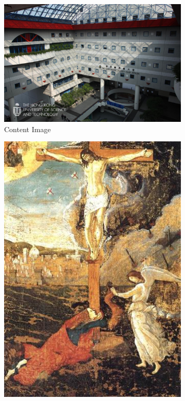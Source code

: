 \documentclass{article}
\begin{document}
\begin{figure}[ht]
    \begin{minipage}{\textwidth}
        \centering
        \begin{subfigure}{0.25\textwidth}
            \includegraphics[width=\textwidth]{./data_set/HKUST/14.jpeg}
            \caption{Content Image}
        \end{subfigure}
        \hfill %
        \begin{subfigure}{0.25\textwidth}
            \includegraphics[width=\textwidth]{./wikiart/Early_Renaissance/sandro-botticelli_crucifixion(1).jpg}

\end{subfigure}
\end{minipage}
\end{figure}
\end{document}
